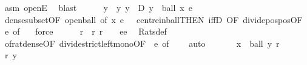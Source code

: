 \begin{isabellebody}
\ asm\ openE\ \isamarkupfalse%
\ blast\isanewline
\ \ \ \ \isamarkupfalse%
\ y\ \ y{\isacharcolon}{\kern0pt}\ {\isachardoublequoteopen}y\ {\isasymin}\ D{\isachardoublequoteclose}\ {\isachardoublequoteopen}y\ {\isasymin}\ ball\ x\ {\isacharparenleft}{\kern0pt}e\ {\isacharslash}{\kern0pt}\ {}{\isacharparenright}{\kern0pt}{\isachardoublequoteclose}\ \isamarkupfalse%
\ dense{\isacharunderscore}{\kern0pt}subset{\isacharparenleft}{\kern0pt}{}{\isacharparenright}{\kern0pt}{\isacharbrackleft}{\kern0pt}OF\ open{\isacharunderscore}{\kern0pt}ball{\isacharcomma}{\kern0pt}\ of\ x\ {\isachardoublequoteopen}e\ {\isacharslash}{\kern0pt}\ {}{\isachardoublequoteclose}{\isacharbrackright}{\kern0pt}\ centre{\isacharunderscore}{\kern0pt}in{\isacharunderscore}{\kern0pt}ball{\isacharbrackleft}{\kern0pt}THEN\ iffD{}{\isacharcomma}{\kern0pt}\ OF\ divide{\isacharunderscore}{\kern0pt}pos{\isacharunderscore}{\kern0pt}pos{\isacharbrackleft}{\kern0pt}OF\ e{\isacharparenleft}{\kern0pt}{}{\isacharparenright}{\kern0pt}{\isacharcomma}{\kern0pt}\ of\ {}{\isacharbrackright}{\kern0pt}{\isacharbrackright}{\kern0pt}\ \isamarkupfalse%
\ force\isanewline
\ \ \ \ \isamarkupfalse%
\ r\ \ r{\isacharcolon}{\kern0pt}\ {\isachardoublequoteopen}r\ {\isasymin}\ {\isasymrat}\ {\isasyminter}\ {\isacharbraceleft}{\kern0pt}e{\isacharslash}{\kern0pt}{}{\isacharless}{\kern0pt}{\isachardot}{\kern0pt}{\isachardot}{\kern0pt}{\isacharless}{\kern0pt}e{\isacharslash}{\kern0pt}{}{\isacharbraceright}{\kern0pt}{\isachardoublequoteclose}\ \isamarkupfalse%
\ Rats{\isacharunderscore}{\kern0pt}def\ \isamarkupfalse%
\ of{\isacharunderscore}{\kern0pt}rat{\isacharunderscore}{\kern0pt}dense{\isacharbrackleft}{\kern0pt}OF\ divide{\isacharunderscore}{\kern0pt}strict{\isacharunderscore}{\kern0pt}left{\isacharunderscore}{\kern0pt}mono{\isacharbrackleft}{\kern0pt}OF\ {\isacharunderscore}{\kern0pt}\ e{\isacharparenleft}{\kern0pt}{}{\isacharparenright}{\kern0pt}{\isacharbrackright}{\kern0pt}{\isacharcomma}{\kern0pt}\ of\ {}\ {}{\isacharbrackright}{\kern0pt}\ \isamarkupfalse%
\ auto\isanewline
\isanewline
\ \ \ \ \isamarkupfalse%
\ {\isacharasterisk}{\kern0pt}{\isacharcolon}{\kern0pt}\ {\isachardoublequoteopen}x\ {\isasymin}\ ball\ y\ r{\isachardoublequoteclose}\ \isamarkupfalse%
\ r\ y\ \isamarkupfalse%

\end{isabellebody}
